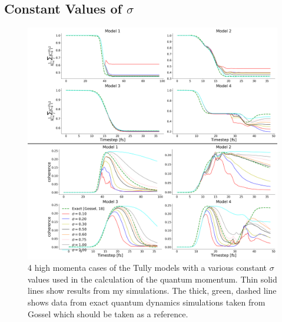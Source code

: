 \subsection{Constant Values of $\sigma$}
\begin{figure}[ht]
  \includegraphics[width=\textwidth]{../img/CTMQC/TullyModels/CTMQC_VarSig_highMom.png}
  \caption{\label{fig:VaryingSigmaTullyModels}4 high momenta cases of the Tully models with a various constant $\sigma$ values used in the calculation of the quantum momentum. Thin solid lines show results from my simulations. The thick, green, dashed line shows data from exact quantum dynamics simulations taken from Gossel \cite{gossel_coupled-trajectory_2018} which should be taken as a reference.}
\end{figure}
